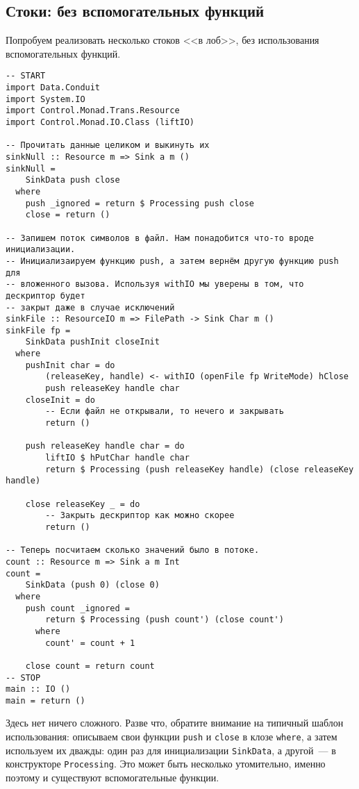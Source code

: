 \subsection{Стоки: без вспомогательных функций}
Попробуем реализовать несколько стоков <<в лоб>>, без использования вспомогательных функций.
\begin{lstlisting}
-- START
import Data.Conduit
import System.IO
import Control.Monad.Trans.Resource
import Control.Monad.IO.Class (liftIO)

-- Прочитать данные целиком и выкинуть их
sinkNull :: Resource m => Sink a m ()
sinkNull =
    SinkData push close
  where
    push _ignored = return $ Processing push close
    close = return ()

-- Запишем поток символов в файл. Нам понадобится что-то вроде инициализации.
-- Инициализаируем функцию push, а затем вернём другую функцию push для 
-- вложенного вызова. Используя withIO мы уверены в том, что дескриптор будет 
-- закрыт даже в случае исключений
sinkFile :: ResourceIO m => FilePath -> Sink Char m ()
sinkFile fp =
    SinkData pushInit closeInit
  where
    pushInit char = do
        (releaseKey, handle) <- withIO (openFile fp WriteMode) hClose
        push releaseKey handle char
    closeInit = do
        -- Если файл не открывали, то нечего и закрывать
        return ()

    push releaseKey handle char = do
        liftIO $ hPutChar handle char
        return $ Processing (push releaseKey handle) (close releaseKey handle)

    close releaseKey _ = do
        -- Закрыть дескриптор как можно скорее
        return ()

-- Теперь посчитаем сколько значений было в потоке.
count :: Resource m => Sink a m Int
count =
    SinkData (push 0) (close 0)
  where
    push count _ignored =
        return $ Processing (push count') (close count')
      where
        count' = count + 1

    close count = return count
-- STOP
main :: IO ()
main = return ()
\end{lstlisting}
Здесь нет ничего сложного. Разве что, обратите внимание на типичный шаблон использования:
описываем свои функции \lstinline'push' и \lstinline'close' в клозе \lstinline'where', а
затем используем их дважды:
один раз для инициализации \lstinline'SinkData', а другой~--- в конструкторе
\lstinline'Processing'. 
Это может быть несколько утомительно, именно поэтому и существуют вспомогательные функции.

